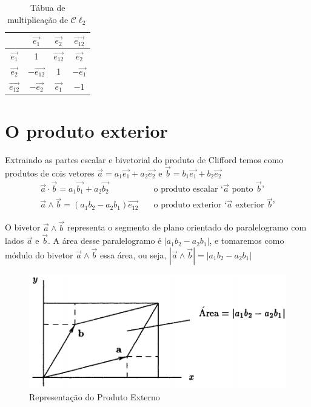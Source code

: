 \documentclass[12pt, oneside, a4paper, english, brazil]{abntex2}
\providecommand{\abs}[1]{\left\vert #1 \right\vert}
\providecommand{\p}[1]{\left( #1 \right)}
\providecommand{\Cldois}{\mathcal{C}\ell_2}
\renewcommand{\vec}{\overrightarrow}
\theoremstyle{normal}
\theoremstyle{observacao}
\begin{document}
\begin{table}[h!]
\centering
\begin{tabular}{c | c c c}
 & $\vec{e_1}$ & $\vec{e_2}$ & $\vec{e_{12}}$\\ \hline
$\vec{e_1}$ & 1 & $\vec{e_{12}}$ & $\vec{e_2}$ \\
$\vec{e_2}$ & $-\vec{e_{12}}$ & 1 & $-\vec{e_1}$ \\
$\vec{e_{12}}$ & $-\vec{e_2}$ & $\vec{e_1}$ & $-1$ 
\end{tabular}
\caption{Tábua de multiplicação de $\Cldois$}
\label{tabuacl2}
\end{table}


\section{O produto exterior}

Extraindo as partes escalar e bivetorial do produto de Clifford temos como produtos de cois vetores $\vec{a}=a_1\vec{e_1}+a_2\vec{e_2}$ e $\vec{b}=b_1\vec{e_1}+b_2\vec{e_2}$
\begin{align*}
\vec{a}\cdot\vec{b}= a_1\vec{b_1}+a_2\vec{b_2}\quad &\text{o produto escalar `$\vec{a}$ ponto $\vec{b}$'}\\
\vec{a}\wedge\vec{b} = \p{a_1b_2-a_2b_1}\vec{e_{12}}\quad &\text{o produto exterior `$\vec{a}$ exterior $\vec{b}$'}
\end{align*}

O bivetor $\vec{a}\wedge\vec{b}$ representa o segmento de plano orientado do paralelogramo com lados $\vec{a}$ e $\vec{b}$. A área desse paralelogramo é $\abs{a_1b_2-a_2b_1}$, e tomaremos como módulo do bivetor $\vec{a}\wedge\vec{b}$ essa área, ou seja, $\abs{\vec{a}\wedge\vec{b}}=\abs{a_1b_2-a_2b_1}$

\begin{figure}[h!]
\centering
\includegraphics[scale=0.5]{externo}
\caption{Representação do Produto Externo \cite[p. 10]{lounesto2001}}
\label{externo}
\end{figure}
\end{document}
